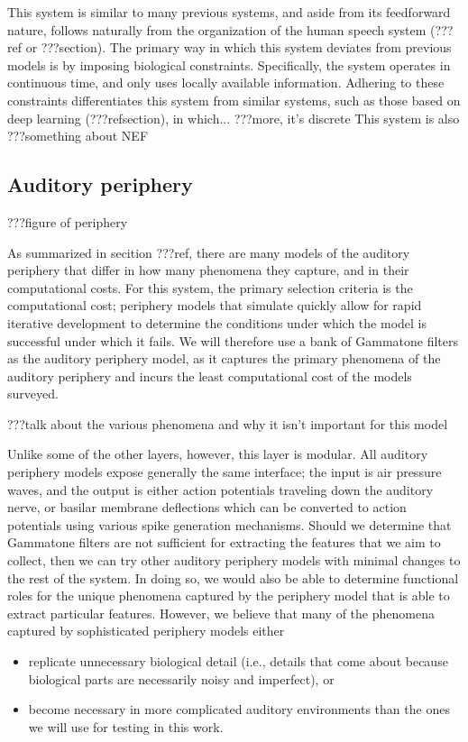 This system is similar to many previous systems,
and aside from its feedforward nature,
follows naturally from the organization
of the human speech system (???ref or ???section).
The primary way in which this system
deviates from previous models
is by imposing biological constraints.
Specifically, the system operates
in continuous time,
and only uses locally available information.
Adhering to these constraints differentiates
this system from similar systems,
such as those based on deep learning (???refsection),
in which... ???more, it's discrete
This system is also ???something about NEF

\subsection{Auditory periphery}

???figure of periphery

As summarized in secition ???ref,
there are many models of the auditory periphery
that differ in how many phenomena they capture,
and in their computational costs.
For this system,
the primary selection criteria is
the computational cost;
periphery models that simulate quickly
allow for rapid iterative development
to determine the conditions
under which the model is successful
under which it fails.
We will therefore use
a bank of Gammatone filters as the
auditory periphery model,
as it captures the primary phenomena
of the auditory periphery
and incurs the least computational cost
of the models surveyed.

???talk about the various phenomena
and why it isn't important for this model

Unlike some of the other layers, however,
this layer is modular.
All auditory periphery models expose
generally the same interface;
the input is air pressure waves,
and the output is either action potentials
traveling down the auditory nerve,
or basilar membrane deflections
which can be converted to action potentials
using various spike generation mechanisms.
Should we determine that Gammatone filters
are not sufficient for extracting
the features that we aim to collect,
then we can try other auditory periphery models
with minimal changes to the rest of the system.
In doing so, we would also be able to
determine functional roles for the
unique phenomena captured by the
periphery model that is able to extract particular features.
However, we believe that many
of the phenomena captured
by sophisticated periphery models either
\begin{itemize}
\item replicate unnecessary biological detail
  (i.e., details that come about because biological parts
  are necessarily noisy and imperfect), or
\item become necessary in more complicated
  auditory environments than the ones
  we will use for testing in this work.
\end{itemize}

